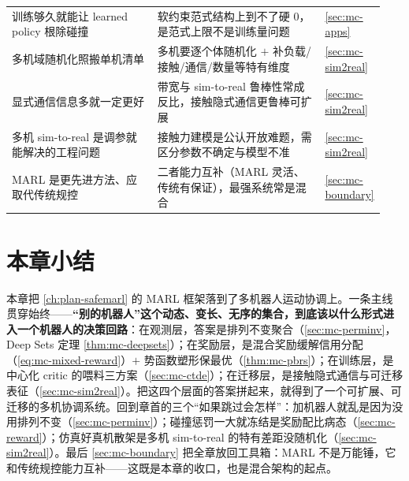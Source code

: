 \begin{table}[H]
\begin{tabular}{p{0.40\linewidth}p{0.46\linewidth}p{0.08\linewidth}}
训练够久就能让 learned policy 根除碰撞 & 软约束范式结构上到不了硬 $0$，是范式上限不是训练量问题 & \cref{sec:mc-apps} \\
多机域随机化照搬单机清单 & 多机要逐个体随机化 $+$ 补负载/接触/通信/数量等特有维度 & \cref{sec:mc-sim2real} \\
显式通信信息多就一定更好 & 带宽与 sim-to-real 鲁棒性常成反比，接触隐式通信更鲁棒可扩展 & \cref{sec:mc-sim2real} \\
多机 sim-to-real 是调参就能解决的工程问题 & 接触力建模是公认开放难题，需区分参数不确定与模型不准 & \cref{sec:mc-sim2real} \\
MARL 是更先进方法、应取代传统规控 & 二者能力互补（MARL 灵活、传统有保证），最强系统常是混合 & \cref{sec:mc-boundary} \\
\bottomrule
\end{tabular}
\end{table}

\section*{本章小结}

本章把 \cref{ch:plan-safemarl} 的 MARL 框架落到了多机器人运动协调上。一条主线贯穿始终——\textbf{“别的机器人”这个动态、变长、无序的集合，到底该以什么形式进入一个机器人的决策回路}：在观测层，答案是排列不变聚合（\cref{sec:mc-perminv}，Deep Sets 定理 \cref{thm:mc-deepsets}）；在奖励层，是混合奖励缓解信用分配（\cref{eq:mc-mixed-reward}）$+$ 势函数塑形保最优（\cref{thm:mc-pbrs}）；在训练层，是中心化 critic 的喂料三方案（\cref{sec:mc-ctde}）；在迁移层，是接触隐式通信与可迁移表征（\cref{sec:mc-sim2real}）。把这四个层面的答案拼起来，就得到了一个可扩展、可迁移的多机协调系统。回到章首的三个“如果跳过会怎样”：加机器人就乱是因为没用排列不变（\cref{sec:mc-perminv}）；碰撞惩罚一大就冻结是奖励配比病态（\cref{sec:mc-reward}）；仿真好真机散架是多机 sim-to-real 的特有差距没随机化（\cref{sec:mc-sim2real}）。最后 \cref{sec:mc-boundary} 把全章放回工具箱：MARL 不是万能锤，它和传统规控能力互补——这既是本章的收口，也是混合架构的起点。

